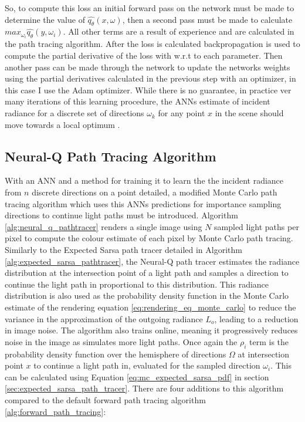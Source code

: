 \documentclass[../dissertation.tex]{subfiles}
\begin{document}
So, to compute this loss an initial forward pass on the network must be made to determine the value of $\hat{q_\theta}(x, \omega)$, then a second pass must be made to calculate $max_{\omega_i} \hat{q_\theta}(y, \omega_i)$. All other terms are a result of experience and are calculated in the path tracing algorithm. After the loss is calculated backpropagation is used to compute the partial derivative of the loss with w.r.t to each parameter. Then another pass can be made through the network to update the networks weights using the partial derivatives calculated in the previous step with an optimizer, in this case I use the Adam optimizer. While there is no guarantee, in practice ver many iterations of this learning procedure, the ANNs estimate of incident radiance for a discrete set of directions $\omega_k$ for any point $x$ in the scene should move towards a local optimum \cite{deep_rl_function_approx}.

\subsection{Neural-Q Path Tracing Algorithm}

With an ANN and a method for training it to learn the the incident radiance from $n$ discrete directions on a point detailed, a modified Monte Carlo path tracing algorithm which uses this ANNs predictions for importance sampling directions to continue light paths must be introduced. Algorithm \ref{alg:neural_q_pathtracer} renders a single image using $N$ sampled light paths per pixel to compute the colour estimate of each pixel by Monte Carlo path tracing. Similarly to the Expected Sarsa path tracer detailed in Algorithm \ref{alg:expected_sarsa_pathtracer}, the Neural-Q path tracer estimates the radiance distribution at the intersection point of a light path and samples a direction to continue the light path in proportional to this distribution. This radiance distribution is also used as the probability density function in the Monte Carlo estimate of the rendering equation \ref{eq:rendering_eq_monte_carlo} to reduce the variance in the approximation of the outgoing radiance $L_o$, leading to a reduction in image noise. The algorithm also trains online, meaning it progressively reduces noise in the image as simulates more light paths. Once again the $\rho_i$ term is the probability density function over the hemisphere of directions $\Omega$ at intersection point $x$ to continue a light path in, evaluated for the sampled direction $\omega_i$. This can be calculated using Equation \ref{eq:mc_expected_sarsa_pdf} in section \ref{sec:expected_sarsa_path_tracer}. There are four additions to this algorithm compared to the default forward path tracing algorithm \ref{alg:forward_path_tracing}:
\end{document}
